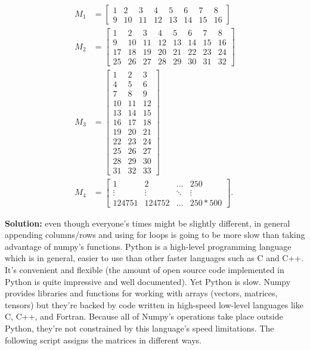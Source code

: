 \documentclass[11pt]{article}
\begin{document}
\begin{align*}
M_{1}  &= \begin{bmatrix} 1 & 2 & 3 & 4& 5 & 6 & 7 & 8 \\ 9 & 10 & 11 & 12 & 13 & 14 & 15 & 16  \end{bmatrix}  \\
M_{2}  &= \begin{bmatrix} 1 & 2 & 3 & 4& 5 & 6 & 7 & 8 \\ 9 & 10 & 11 & 12 & 13 & 14 & 15 & 16 \\ 17 & 18 & 19 & 20 & 21 & 22 & 23 & 24 \\ 25 & 26 & 27 & 28 & 29 & 30 & 31 & 32  \end{bmatrix}  \\
M_{3}  &= \begin{bmatrix} 1 & 2 & 3 \\ 4& 5 & 6 \\ 7 & 8 & 9 \\ 10 & 11 & 12 \\ 13 & 14 & 15 \\ 16 & 17 & 18 \\ 19 & 20 & 21 \\ 22 & 23 & 24 \\ 25 & 26 & 27 \\ 28 & 29 & 30 \\ 31 & 32 & 33  \end{bmatrix} \\
M_{4} &= \begin{bmatrix} 1 & 2 & \hdots & 250 \\ \vdots & \vdots & \ddots & \vdots \\ 124751 & 124752 & \hdots & 250*500 \end{bmatrix}.
\end{align*}


\textbf{Solution:} even though everyone's times might be slightly different, in general appending columns/rows and using for loops is going to be more slow than taking advantage of numpy's functions. Python is a high-level programming language which is in general, easier to use than other faster languages such as C and C++. It's convenient and flexible (the amount of open source code implemented in Python is quite impressive and well documented). Yet Python is slow. Numpy provides libraries and functions for working with arrays (vectors, matrices, tensors) but they're backed by code written in high-speed low-level languages like C, C++, and Fortran. Because all of Numpy's operations take place outside Python, they're not constrained by this language's speed limitations.  
The following script assigns the matrices in different ways.
\end{document}
